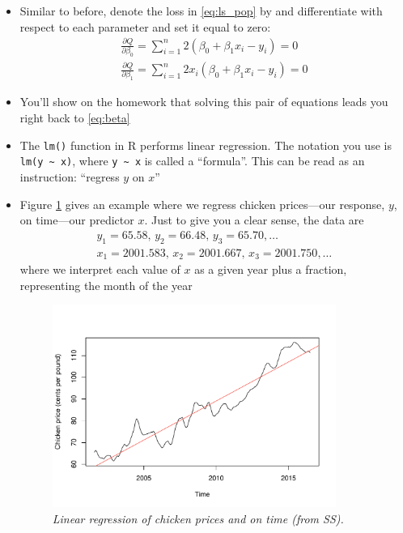 \documentclass{article}
\begin{document}
\begin{itemize}
\item Similar to before, denote the loss in \eqref{eq:ls_pop} by  and differentiate with
    respect to each parameter and set it equal to zero:
  \begin{gather*}
  \frac{\partial Q}{\partial \beta_0} =  \sum_{i=1}^n 2(\beta_0 + \beta_1 x_i -
  y_i) = 0 \\ 
   \frac{\partial Q}{\partial \beta_1} = \sum_{i=1}^n  2x_i (\beta_0 + \beta_1
   x_i - y_i) = 0  
  \end{gather*}
 
\item You'll show on the homework that solving this pair of equations leads you
  right back to \eqref{eq:beta}

\item The \verb|lm()| function in R performs linear regression. The notation you
  use is \verb|lm(y ~ x)|, where \verb|y ~ x| is called a ``formula''. This can
  be read as an instruction: ``regress $y$  on $x$''    

\item Figure \ref{fig:chicken} gives an example where we regress chicken
  prices---our response, $y$, on time---our predictor $x$. Just to give you a
  clear sense, the data are
  \begin{gather*}
  y_1 = 65.58, \, y_2 = 66.48, \, y_3 = 65.70, \dots \\
  x_1 = 2001.583, \, x_2 = 2001.667, \, x_3 = 2001.750, \dots
  \end{gather*}
  where we interpret each value of $x$ as a given year plus a fraction,
  representing the month of the year 

\begin{figure}[tb]
\centering
\includegraphics[width=0.875\textwidth]{fig/chicken-1.pdf}
\caption{\it Linear regression of chicken prices and on time (from SS).} 
\label{fig:chicken}
\end{figure}
  

\end{itemize}
\end{document}
